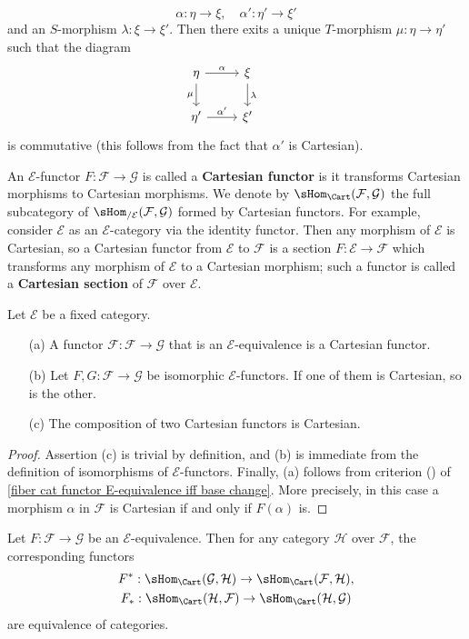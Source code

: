 \[\alpha:\eta\to \xi,\quad \alpha':\eta'\to \xi'\]
and an $S$-morphism $\lambda:\xi\to \xi'$. Then there exits a unique  $T$-morphism $\mu:\eta\to\eta'$ such that the diagram
\[\begin{tikzcd}
\eta\ar[d,swap,"\mu"]\ar[r,"\alpha"]&\xi\ar[d,"\lambda"]&\\
\eta'\ar[r,"\alpha'"]&\xi'
\end{tikzcd}\]
is commutative (this follows from the fact that $\alpha'$ is Cartesian).\par
An $\mathcal{E}$-functor $F:\mathcal{F}\to \mathcal{G}$ is called a \textbf{Cartesian functor} is it transforms Cartesian morphisms to Cartesian morphisms. We denote by $\sHom_{\Cart}(\mathcal{F},\mathcal{G})$ the full subcategory of $\sHom_{/\mathcal{E}}(\mathcal{F},\mathcal{G})$ formed by Cartesian functors. For example, consider $\mathcal{E}$ as an $\mathcal{E}$-category via the identity functor. Then any morphism of $\mathcal{E}$ is Cartesian, so a Cartesian functor from $\mathcal{E}$ to $\mathcal{F}$ is a section $F:\mathcal{E}\to \mathcal{F}$ which transforms any morphism of $\mathcal{E}$ to a Cartesian morphism; such a functor is called a \textbf{Cartesian section} of $\mathcal{F}$ over $\mathcal{E}$.
\begin{proposition}\label{fiber cat Cartesian functor prop}
Let $\mathcal{E}$ be a fixed category.
\begin{enumerate}
\item[(a)] A functor $\mathcal{F}:\mathcal{F}\to \mathcal{G}$ that is an $\mathcal{E}$-equivalence is a Cartesian functor.
\item[(b)] Let $F,G:\mathcal{F}\to \mathcal{G}$ be isomorphic $\mathcal{E}$-functors. If one of them is Cartesian, so is the other.
\item[(c)] The composition of two Cartesian functors is Cartesian.
\end{enumerate}
\end{proposition}
\begin{proof}
Assertion (c) is trivial by definition, and (b) is immediate from the definition of isomorphisms of $\mathcal{E}$-functors. Finally, (a) follows from criterion () of \cref{fiber cat functor E-equivalence iff base change}. More precisely, in this case a morphism $\alpha$ in $\mathcal{F}$ is Cartesian if and only if $F(\alpha)$ is.
\end{proof}
\begin{corollary}\label{fiber cat E-equivalence induced Cartesian Hom equivalence}
Let $F:\mathcal{F}\to \mathcal{G}$ be an $\mathcal{E}$-equivalence. Then for any category $\mathcal{H}$ over $\mathcal{F}$, the corresponding functors
\begin{gather*}
F^*:\sHom_{\Cart}(\mathcal{G},\mathcal{H})\to \sHom_{\Cart}(\mathcal{F},\mathcal{H}),\\
F_*:\sHom_{\Cart}(\mathcal{H},\mathcal{F})\to \sHom_{\Cart}(\mathcal{H},\mathcal{G})
\end{gather*}
are equivalence of categories.
\end{corollary}
